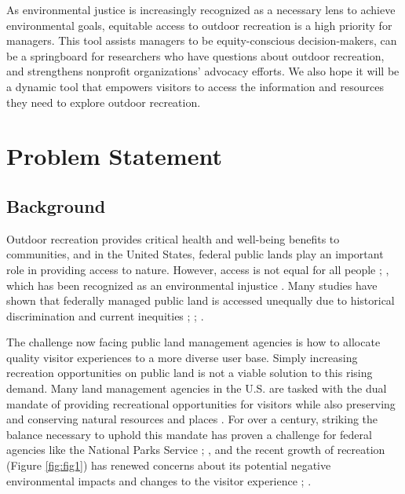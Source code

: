 \documentclass[
]{book}
\begin{document}
As environmental justice is increasingly recognized as a necessary lens to achieve environmental goals, equitable access to outdoor recreation is a high priority for managers. This tool assists managers to be equity-conscious decision-makers, can be a springboard for researchers who have questions about outdoor recreation, and strengthens nonprofit organizations' advocacy efforts. We also hope it will be a dynamic tool that empowers visitors to access the information and resources they need to explore outdoor recreation.

\hypertarget{problem-statement}{%
\chapter{Problem Statement}\label{problem-statement}}

\hypertarget{background}{%
\section{Background}\label{background}}

Outdoor recreation provides critical health and well-being benefits to communities, and in the United States, federal public lands play an important role in providing access to nature. However, access is not equal for all people \citep{Ewert1990}; \citep{Flores2018}, which has been recognized as an environmental injustice \citep{Floyd2002}. Many studies have shown that federally managed public land is accessed unequally due to historical discrimination and current inequities \citep{Floyd2002}; \citep{Shelby1989}; \citep{Xiao2021}.

The challenge now facing public land management agencies is how to allocate quality visitor experiences to a more diverse user base. Simply increasing recreation opportunities on public land is not a viable solution to this rising demand. Many land management agencies in the U.S. are tasked with the dual mandate of providing recreational opportunities for visitors while also preserving and conserving natural resources and places \citep{Shartaj2020}. For over a century, striking the balance necessary to uphold this mandate has proven a challenge for federal agencies like the National Parks Service \citep{Meinecke1937}; \citep{Sax1980}, and the recent growth of recreation (Figure \ref{fig:fig1}) has renewed concerns about its potential negative environmental impacts and changes to the visitor experience \citep{Hammitt2015}; \citep{Timmons2019}.
\end{document}

